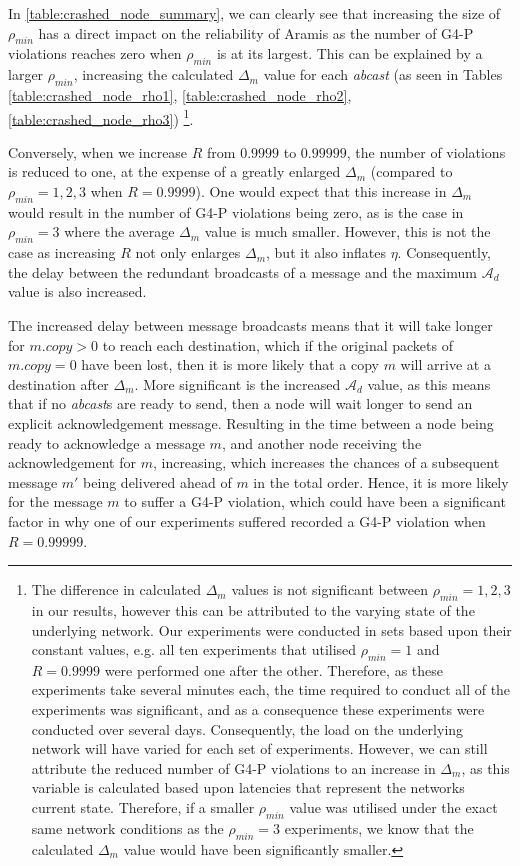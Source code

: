     In \ref{table:crashed_node_summary}, we can clearly see that increasing the size of $\rho_{min}$ has a direct impact on the reliability of \textsf{Aramis} as the number of G4-P violations reaches zero when $\rho_{min}$ is at its largest.  This can be explained by a larger $\rho_{min}$, increasing the calculated $\Delta_m$ value for each \emph{abcast} (as seen in Tables \ref{table:crashed_node_rho1}, \ref{table:crashed_node_rho2},  \ref{table:crashed_node_rho3}) \footnote{The difference in calculated $\Delta_m$ values is not significant between $\rho_{min}=1,2,3$ in our results, however this can be attributed to the varying state of the underlying network.  Our experiments were conducted in sets based upon their constant values, e.g. all ten experiments that utilised $\rho_{min}=1$ and $R=0.9999$ were performed one after the other.  Therefore, as these experiments take several minutes each, the time required to conduct all of the experiments was significant, and as a consequence these experiments were conducted over several days.  Consequently, the load on the underlying network will have varied for each set of experiments.  However, we can still attribute the reduced number of G4-P violations to an increase in $\Delta_m$, as this variable is calculated based upon latencies that represent the networks current state.  Therefore, if a smaller $\rho_{min}$ value was utilised under the exact same network conditions as the $\rho_{min}=3$ experiments, we know that the calculated $\Delta_m$ value would have been significantly smaller.}.  
    
    Conversely, when we increase $R$ from $0.9999$ to $0.99999$, the number of violations is reduced to one, at the expense of a greatly enlarged $\Delta_m$ (compared to $\rho_{min}=1,2,3$ when $R=0.9999$).  One would expect that this increase in $\Delta_m$ would result in the number of G4-P violations being zero, as is the case in $\rho_{min}=3$ where the average $\Delta_m$ value is much smaller.  However, this is not the case as increasing $R$ not only enlarges $\Delta_m$, but it also inflates $\eta$.  Consequently, the delay between the redundant broadcasts of a message and the maximum $\mathcal{A}_d$ value is also increased. 
    
     The increased delay between message broadcasts means that it will take longer for $m.copy > 0$ to reach each destination, which if the original packets of $m.copy = 0$ have been lost, then it is more likely that a copy $m$ will arrive at a destination after $\Delta_m$.  More significant is the increased  $\mathcal{A}_d$ value, as this means that if no \emph{abcast}s are ready to send, then a node will wait longer to send an explicit acknowledgement message.  Resulting in the time between a node being ready to acknowledge a message $m$, and another node receiving the acknowledgement for $m$, increasing, which increases the chances of a subsequent message $m'$ being delivered ahead of $m$ in the total order. Hence, it is more likely for the message $m$ to suffer a G4-P violation, which could have been a significant factor in why one of our experiments suffered recorded a G4-P violation when $R=0.99999$.  
    
